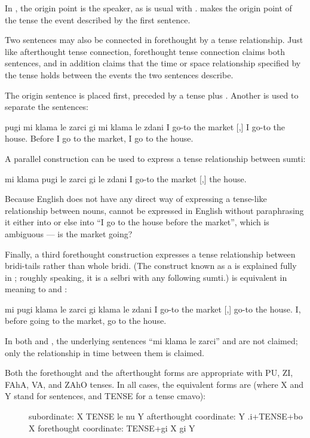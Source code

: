 In , the origin point is
    the speaker, as is usual with .  makes the origin point of the
    tense the event described by the first sentence.

Two sentences may also be connected in forethought by a
    tense relationship. Just like afterthought tense connection,
    forethought tense connection claims both sentences, and in
    addition claims that the time or space relationship specified
    by the tense holds between the events the two sentences
    describe.

The origin sentence is placed first, preceded by a tense
    plus . Another  is used to separate the
    sentences:
\begin{example}
pugi mi klama le zarci gi mi klama le zdani\n
{} I go-to the market [,] I go-to the house.\n
Before I go to the market, I go to the house.
\end{example}

A parallel construction can be used to express a tense
    relationship between sumti:
\begin{example}
mi klama pugi le zarci gi le zdani\n
I go-to  the market [,] the house.
\end{example}

Because English does not have any direct way of expressing a
    tense-like relationship between nouns,  cannot be expressed in English without paraphrasing it
    either into  or else into ``I
    go to the house before the market'', which is ambiguous --- is
    the market going?

Finally, a third forethought construction expresses a tense
    relationship between bridi-tails rather than whole bridi. (The
    construct known as a  is explained fully in ; roughly speaking, it is a
    selbri with any following sumti.)  is equivalent in meaning to  and :
\begin{example}
mi pugi klama le zarci gi klama le zdani\n
I  go-to the market [,] go-to the house.\n
I, before going to the market, go to the house.
\end{example}

In both  and , the underlying sentences ``mi
    klama le zarci'' and  are not claimed;
    only the relationship in time between them is claimed. 

Both the forethought and the afterthought forms are
    appropriate with PU, ZI, FAhA, VA, and ZAhO tenses. In all
    cases, the equivalent forms are (where X and Y stand for
    sentences, and TENSE for a tense cmavo):
\begin{description}
\item[] subordinate: X TENSE le nu Y afterthought coordinate: Y .i+TENSE+bo X forethought coordinate: TENSE+gi X gi Y
\end{description}



